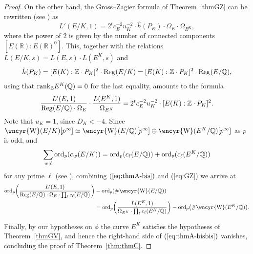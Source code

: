 \documentclass[10pt]{amsart}
\newcommand{\sha}{\text{\wncyr{W}}}
\numberwithin{equation}{section}
\theoremstyle{definition}
\theoremstyle{remark}
\newcommand{\Z}{\mathbb{Z}}
\newcommand{\bQ}{\mathbb{Q}}
\newcommand{\Q}{\mathbb{Q}}
\DeclareMathOperator{\ord}{ord}
\begin{document}
\begin{proof}
On the other hand, the Gross--Zagier formula of Theorem~\ref{thmGZ} can be rewritten (see \cite[p.~312]{grosszagier}) as
\[
L'(E/K,1)=2^tc_E^{-2}u_K^{-2}\cdot\hat{h}(P_K)\cdot
\Omega_E\cdot\Omega_{E^K},
\]
where the power of $2$ is given by the number of connected components $[E(\mathbb{R}):E(\mathbb{R})^0]$.
This, together with the relations $L(E/K,s)=L(E,s)\cdot L(E^K,s)$ and
\[
\hat{h}(P_K)=[E(K):\Z\cdot P_K]^2\cdot{\rm Reg}_{}(E/K)=[E(K):\Z\cdot P_K]^2\cdot{\rm Reg}_{}(E/\Q),
\]
using that ${\rm rank}_\Z E^K(\Q)=0$ for the last equality, amounts to the formula
\begin{equation}\label{eq:GZ}
\frac{L'(E,1)}{{\rm Reg}(E/\bQ)\cdot\Omega_E}\cdot\frac{L(E^K,1)}{\Omega_{E^K}}=2^tc_E^{-2}u_K^{-2}\cdot[E(K):\Z\cdot P_K]^2.
\end{equation}
Note that $u_K=1$, since $D_K<-4$. Since $\sha(E/K)[p^\infty] \simeq\sha(E/\bQ)[p^\infty]\oplus\sha(E^K/\bQ)[p^\infty]$ as $p$ is odd, and   
\[
\sum_{w\vert\ell}{\ord}_p(c_w(E/K))={\rm ord}_p(c_\ell(E/\bQ))+{\rm ord}_p(c_\ell(E^K/\Q))
\]
for any prime $\ell$ (see \cite[Cor.~9.2]{skinner-zhang}), combining $(\ref{eq:thmA-bis})$ and (\ref{eq:GZ}) we arrive at
\begin{equation}\label{eq:thmA-bisbis}
\begin{aligned}
{\rm ord}_p\biggl(\frac{L'(E,1)}{{\rm Reg}(E/\Q)\cdot\Omega_E\cdot\prod_\ell c_\ell(E/\bQ)}\biggr)&-{\rm ord}_p(\#\sha(E/\Q))\\
&=
{\rm ord}_p\biggl(\frac{L(E^K,1)}{\Omega_{E^K}\cdot\prod_\ell c_\ell(E^K/\Q)}\biggr)-{\rm ord}_p\bigl(\#\sha(E^K/\Q)\bigr).
\end{aligned}
\end{equation}

Finally, by our hypotheses on $\phi$ the curve $E^K$ satisfies the hypotheses of Theorem~\ref{thmGV}, and hence the right-hand side of $(\ref{eq:thmA-bisbis})$ vanishes, concluding the proof of Theorem~\ref{thm:thmC}.
\end{proof} 





\end{document}
